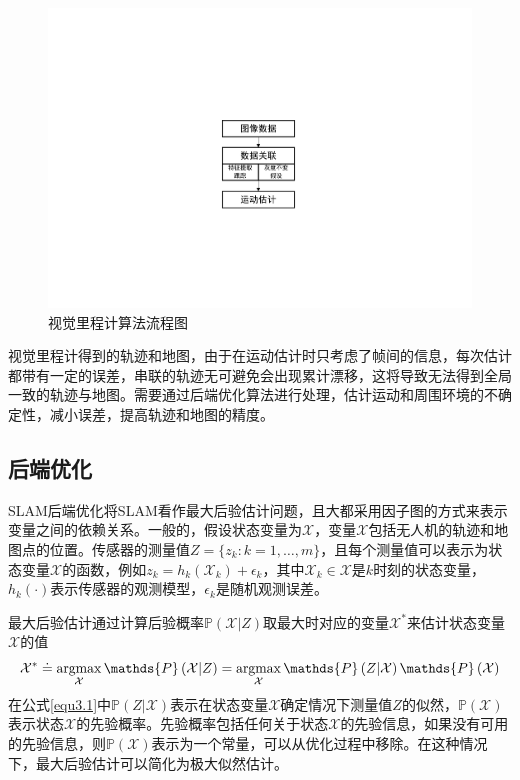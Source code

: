 \begin{figure}[h]
\centering
\includegraphics[scale=0.7,angle=-90]{figures/Fig3-2.pdf}
\caption{视觉里程计算法流程图}
\label{fig3.2}
\end{figure}

视觉里程计得到的轨迹和地图，由于在运动估计时只考虑了帧间的信息，每次估计都带有一定的误差，串联的轨迹无可避免会出现累计漂移，这将导致无法得到全局一致的轨迹与地图。需要通过后端优化算法进行处理，估计运动和周围环境的不确定性，减小误差，提高轨迹和地图的精度。


\subsection{后端优化}
SLAM后端优化将SLAM看作最大后验估计问题，且大都采用因子图的方式来表示变量之间的依赖关系\upcite{[3.2]}。一般的，假设状态变量为$\mathcal{X}$，变量$\mathcal{X}$包括无人机的轨迹和地图点的位置。传感器的测量值$Z=\lbrace z_k:k=1,\ldots ,m\rbrace$，且每个测量值可以表示为状态变量$\mathcal{X}$的函数，例如$z_k=h_k\left( \mathcal{X}_k \right)+\epsilon_k$，其中$\mathcal{X}_k \in \mathcal{X}$是$k$时刻的状态变量，$h_k(\cdot)$表示传感器的观测模型，$\epsilon_k$是随机观测误差。

最大后验估计通过计算后验概率$\mathds{P}\left(\mathcal{X} \vert Z\right)$取最大时对应的变量$\mathcal{X}^*$来估计状态变量$\mathcal{X}$的值
\begin{equation}
\label{equ3.1}
\mathcal{X}^* 
\doteq 
\argmax \limits_{\mathcal{X}} \mathds{P}\left(\mathcal{X} \vert Z\right) 
=
\argmax \limits_{\mathcal{X}}\mathds{P}\left(Z \vert \mathcal{X}  \right)\mathds{P}\left(\mathcal{X}\right)
\end{equation}
在公式\eqref{equ3.1}中$\mathds{P}\left(Z \vert \mathcal{X}  \right)$表示在状态变量$\mathcal{X}$确定情况下测量值$Z$的似然，$\mathds{P}\left(\mathcal{X}\right)$表示状态$\mathcal{X}$的先验概率。先验概率包括任何关于状态$\mathcal{X}$的先验信息，如果没有可用的先验信息，则$\mathds{P}\left(\mathcal{X}\right)$表示为一个常量，可以从优化过程中移除。在这种情况下，最大后验估计可以简化为极大似然估计。

